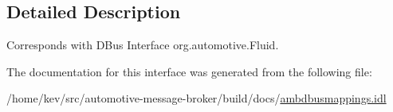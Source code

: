 \subsection{Detailed Description}
Corresponds with D\+Bus Interface org.\+automotive.\+Fluid. 

The documentation for this interface was generated from the following file\+:\begin{DoxyCompactItemize}
\item 
/home/kev/src/automotive-\/message-\/broker/build/docs/\hyperlink{ambdbusmappings_8idl}{ambdbusmappings.\+idl}\end{DoxyCompactItemize}
